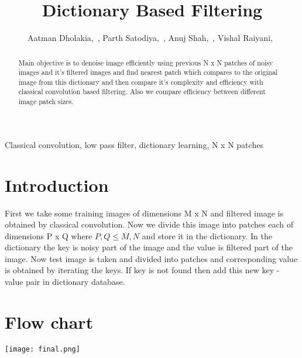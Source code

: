 \documentclass[journal]{IEEEtran}
\begin{document}
	\title{Dictionary Based Filtering}
	
	\author{Aatman Dholakia,~,
		Parth Satodiya,~,
		Anuj Shah,~,
		Vishal Raiyani,~}
	
	
	
	
	\maketitle
	
	
	\begin{abstract}
		Main objective is to denoise image efficiently using previous N x N patches of noisy images and it's filtered images and find nearest patch which compares to the original image from this dictionary and then compare it's complexity and efficiency with classical convolution based filtering. Also we compare efficiency between different image patch sizes.
		
	\end{abstract}
	\begin{IEEEkeywords}
		Classical convolution, low pass filter, dictionary learning, N x N patches
	\end{IEEEkeywords}
	
	
	\IEEEpeerreviewmaketitle
	
	
	
	\section{\textbf{Introduction}}
    First we take some training images of dimensions M x N and filtered image is obtained by classical convolution. Now we divide this image into patches each of dimensions P x Q  where $P, Q \le M, N$ and store it in the dictionary. In the dictionary the key is noisy part of the image and the value is filtered part of the image. Now test image is taken and divided into patches and corresponding value is obtained by iterating the keys. If key is not found then add this new key - value pair in dictionary database.
    

	\section{\textbf{Flow chart}}
    \begin{minipage}{\linewidth}
		\centering
		\texttt{[image: final.png]}
	\end{minipage} 
		
\end{document}
